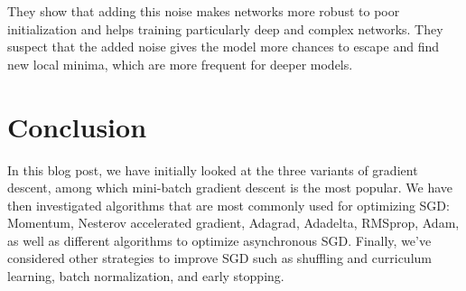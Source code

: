 \documentclass{article}
\begin{document}
They show that adding this noise makes networks more robust to poor initialization and helps training particularly deep and complex networks. They suspect that the added noise gives the model more chances to escape and find new local minima, which are more frequent for deeper models.

\section{Conclusion}

In this blog post, we have initially looked at the three variants of gradient descent, among which mini-batch gradient descent is the most popular. We have then investigated algorithms that are most commonly used for optimizing SGD: Momentum, Nesterov accelerated gradient, Adagrad, Adadelta, RMSprop, Adam, as well as different algorithms to optimize asynchronous SGD. Finally, we've considered other strategies to improve SGD such as shuffling and curriculum learning, batch normalization, and early stopping.



\end{document}
